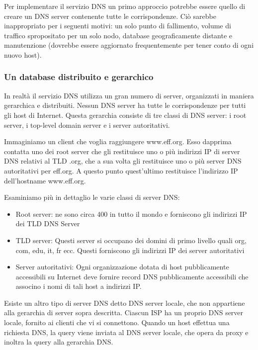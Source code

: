 \documentclass{book}
\begin{document}
Per implementare il servizio DNS un primo approccio potrebbe essere quello di creare un DNS server contenente tutte le corrispondenze. Ciò sarebbe inappropriato per i seguenti motivi: un solo punto di fallimento, volume di traffico spropositato per un solo nodo, database geograficamente distante e manutenzione (dovrebbe essere aggiornato frequentemente per tener conto di ogni nuovo host).

\subsubsection*{Un database distribuito e gerarchico}
In realtà il servizio DNS utilizza un gran numero di server, organizzati in maniera gerarchica e distribuiti. Nessun DNS server ha tutte le corrispondenze per tutti gli host di Internet. Questa gerarchia consiste di tre classi di DNS server: i root server, i top-level domain server e i server autoritativi.

Immaginiamo un client che voglia raggiungere www.eff.org. Esso dapprima contatta uno dei root server che gli restituisce uno o più indirizzi IP di server DNS relativi al TLD .org, che a sua volta gli restituisce uno o più server DNS autoritativi per eff.org. A questo punto quest'ultimo restituisce l'indirizzo IP dell'hostname www.eff.org.

Esaminiamo più in dettaglio le varie classi di server DNS:
\begin{itemize}
	\item Root server: ne sono circa 400 in tutto il mondo e forniscono gli indirizzi IP dei TLD DNS Server
	\item TLD server: Questi server si occupano dei domini di primo livello quali org, com, edu, it, fr ecc. Questi forniscono gli indirizzi IP dei server autoritativi
	\item Server autoritativi: Ogni organizzazione dotata di host pubblicamente accessibili su Internet deve fornire record DNS pubblicamente accessibili che associno i nomi di tali host a indirizzi IP.
\end{itemize}

Esiste un altro tipo di server DNS detto DNS server locale, che non appartiene alla gerarchia di server sopra descritta. Ciascun ISP ha un proprio DNS server locale, fornito ai clienti che vi si connettono. Quando un host effettua una richiesta DNS, la query viene inviata al DNS server locale, che opera da proxy e inoltra la query alla gerarchia DNS.
\end{document}
